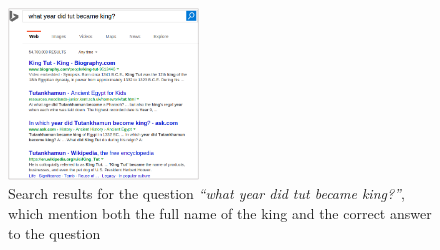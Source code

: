 \begin{figure}[!h]
\centering
\includegraphics[width=0.45\textwidth]{img/web_search_entitylink}
\vspace{-0.2cm}
\caption{Search results for the question \textit{``what year did tut became king?''}, which mention both the full name of the king and the correct answer to the question}
\label{fig:web_search_entitylink}
\end{figure}


